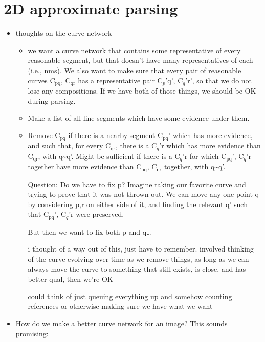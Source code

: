 \documentclass{book}
\begin{document}
\section{2D approximate parsing}
\label{sec-5_2}


\begin{itemize}
\item thoughts on the curve network

\begin{itemize}
\item we want a curve network that contains some representative of
      every reasonable segment, but that doesn't have many
      representatives of each (i.e., nms). We also want to make sure
      that every pair of reasonable curves C$_{\mathrm{pq}}$, C$_{\mathrm{qr}}$ has a
      representative pair C$_p$'q', C$_q$'r', so that we do not lose any
      compositions. If we have both of those things, we should be OK
      during parsing.
\item Make a list of all line segments which have some evidence under
      them.
\item Remove C$_{\mathrm{pq}}$ if there is a nearby segment C$_{\mathrm{pq}}$' which has more
      evidence, and such that, for every C$_{\mathrm{qr}}$, there is a C$_q$'r which
      has more evidence than C$_{\mathrm{qr}}$, with q\~{}q'. Might be sufficient if
      there is a C$_q$'r for which C$_{\mathrm{pq}}$', C$_q$'r together have more
      evidence than C$_{\mathrm{pq}}$, C$_{\mathrm{qr}}$ together, with q\~{}q'.

      Question: Do we have to fix p? Imagine taking our favorite curve
      and trying to prove that it was not thrown out. We can move any
      one point q by considering p,r on either side of it, and finding
      the relevant q' such that C$_{\mathrm{pq}}$', C$_q$'r were preserved. 

      But then we want to fix both p and q\ldots{}

      i thought of a way out of this, just have to remember. involved
      thinking of the curve evolving over time as we remove things, as
      long as we can always move the curve to something that still
      exists, is close, and has better qual, then we're OK

      could think of just queuing everything up and somehow counting
      references or otherwise making sure we have what we want
\end{itemize}

\item How do we make a better curve network for an image? This sounds promising:


\end{itemize}
\end{document}
